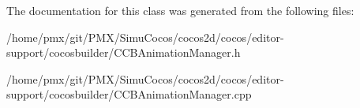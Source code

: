 The documentation for this class was generated from the following files\+:\begin{DoxyCompactItemize}
\item 
/home/pmx/git/\+P\+M\+X/\+Simu\+Cocos/cocos2d/cocos/editor-\/support/cocosbuilder/C\+C\+B\+Animation\+Manager.\+h\item 
/home/pmx/git/\+P\+M\+X/\+Simu\+Cocos/cocos2d/cocos/editor-\/support/cocosbuilder/C\+C\+B\+Animation\+Manager.\+cpp\end{DoxyCompactItemize}
